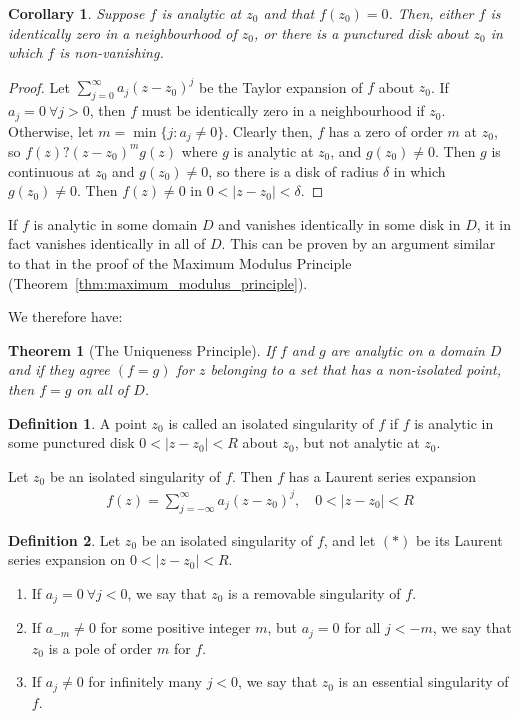 \documentclass[12pt, a4paper]{article}
\theoremstyle{plain}
\newtheorem{thm}{Theorem} %
\newtheorem{cor}{Corollary}
\theoremstyle{definition}
\newtheorem{definition}{Definition} %
\begin{document}
		\begin{cor}
			Suppose $f$ is analytic at $z_0$ and that $f(z_0)=0$. Then, either $f$ is identically zero in a neighbourhood of $z_0$, or there is a punctured disk about $z_0$ in which $f$ is non-vanishing.
		\end{cor}

		\begin{proof}
			Let $\sum\limits_{j=0}^{\infty}a_j(z-z_0)^j$ be the Taylor expansion of $f$ about $z_0$. If $a_j=0\:\forall j>0$, then $f$ must be identically zero in a neighbourhood if $z_0$. Otherwise, let $m=\min\{j:a_j\not=0\}$. Clearly then, $f$ has a zero of order $m$ at $z_0$, so $f(z)?(z-z_0)^mg(z)$ where $g$ is analytic at $z_0$, and $g(z_0)\not=0$. Then $g$ is continuous at $z_0$ and $g(z_0)\not=0$, so there is a disk of radius $\delta$ in which $g(z_0)\not=0$. Then $f(z)\not=0$ in $0<|z-z_0|<\delta$.
		\end{proof}

		If $f$ is analytic in some domain $D$ and vanishes identically in some disk in $D$, it in fact vanishes identically in all of $D$. This can be proven by an argument similar to that in the proof of the Maximum Modulus Principle (Theorem~\ref{thm:maximum_modulus_principle}).

		We therefore have:\\

		\begin{thm}[The Uniqueness Principle]
		\label{thm:uniqueness_principle}
			If $f$ and $g$ are analytic on a domain $D$ and if they agree $(f=g)$ for $z$ belonging to a set that has a non-isolated point, then $f=g$ on all of $D$.\\
		\end{thm}

		\begin{definition}
			A point $z_0$ is called an isolated singularity of $f$ if $f$ is analytic in some punctured disk $0<|z-z_0|<R$ about $z_0$, but not analytic at $z_0$.\\
		\end{definition}

		Let $z_0$ be an isolated singularity of $f$. Then $f$ has a Laurent series expansion
		\begin{align*}
			f(z) =\sum\limits_{j=-\infty}^{\infty}a_j(z-z_0)^j,\quad 0<|z-z_0|<R\tag*{$(*)$}
		\end{align*}

		\begin{definition}
			Let $z_0$ be an isolated singularity of $f$, and let $(*)$ be its Laurent series expansion on $0<|z-z_0|<R$.
			\begin{enumerate}[label=(\roman*)]
				\item If $a_j=0\:\forall j<0$, we say that $z_0$ is a removable singularity of $f$.
				\item If $a_{-m}\not=0$ for some positive integer $m$, but $a_j=0$ for all $j<-m$, we say that $z_0$ is a pole of order $m$ for $f$.
				\item If $a_j\not=0$ for infinitely many $j<0$, we say that $z_0$ is an essential singularity of $f$.
			\end{enumerate}
		\end{definition}
\end{document}
